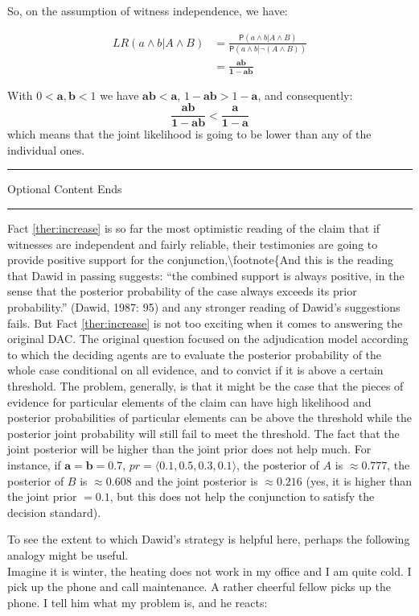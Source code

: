 \documentclass[10pt,dvipsnames,enabledeprecatedfontcommands]{scrartcl}
\newcommand{\ra}{\rangle}
\newcommand{\la}{\langle}
\newcommand{\n}{\neg}
\newcommand{\et}{\wedge}
\newcommand{\pr}[1]{\mathsf{P}(#1)}
\newcommand{\intermezzob}{\nopagebreak 
	\begin{minipage}[c]{13cm}
	\begin{center}\rule{10cm}{0.4pt}

	\tiny{\sc Optional Content Ends}
	
	\vspace{-1mm}
	
	\rule{10cm}{0.4pt}\end{center}
	\end{minipage}
	}
\begin{document}
So, on the assumption of witness independence, we have:

\begin{align*}
LR(a\et b \vert A \et B) & = \frac{\pr{a\et b \vert A \et B}}{\pr{a \et b\vert \n (A \et B)}} \\
& = \frac{\mathbf{ab}}{\mathbf{1-ab}}
\end{align*}

With \(0<\mathbf{a},\mathbf{b}<1\) we have \(\mathbf{ab}<\mathbf{a}\),
\(1-\mathbf{ab}>1-\mathbf{a}\), and consequently:
\[\frac{\mathbf{ab}}{\mathbf{1-ab}} < \frac{\mathbf{a}}{\mathbf{1-a}}\]
which means that the joint likelihood is going to be lower than any of
the individual ones.

\intermezzob

Fact \ref{ther:increase} is so far the most optimistic reading of the
claim that if witnesses are independent and fairly reliable, their
testimonies are going to provide positive support for the
conjunction,\textbackslash{}footnote\{And this is the reading that Dawid
in passing suggests: ``the combined support is always positive, in the
sense that the posterior probability of the case always exceeds its
prior probability.'' (Dawid, 1987: 95) and any stronger reading of
Dawid's suggestions fails. But Fact \ref{ther:increase} is not too
exciting when it comes to answering the original DAC. The original
question focused on the adjudication model according to which the
deciding agents are to evaluate the posterior probability of the whole
case conditional on all evidence, and to convict if it is above a
certain threshold. The problem, generally, is that it might be the case
that the pieces of evidence for particular elements of the claim can
have high likelihood and posterior probabilities of particular elements
can be above the threshold while the posterior joint probability will
still fail to meet the threshold. The fact that the joint posterior will
be higher than the joint prior does not help much. For instance, if
\(\mathbf{a}=\mathbf{b}=0.7\), \(pr=\la 0.1, 0.5, 0.3, 0.1\ra\), the
posterior of \(A\) is \(\approx 0.777\), the posterior of \(B\) is
\(\approx 0.608\) and the joint posterior is \(\approx 0.216\) (yes, it
is higher than the joint prior \(=0.1\), but this does not help the
conjunction to satisfy the decision standard).

To see the extent to which Dawid's strategy is helpful here, perhaps the
following analogy might be useful.\\
Imagine it is winter, the heating does not work in my office and I am
quite cold. I pick up the phone and call maintenance. A rather cheerful
fellow picks up the phone. I tell him what my problem is, and he reacts:
\end{document}
